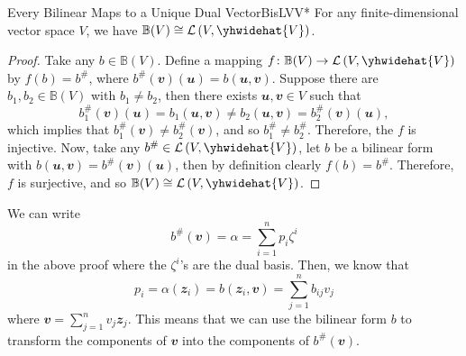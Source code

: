 \documentclass[math, code]{amznotes}
\theoremstyle{remark}
\begin{document}
\begin{probox}{Every Bilinear Maps to a Unique Dual Vector}{BisLVV*}
    For any finite-dimensional vector space $V$, we have $\mathbb{B}(V) \cong \mathcal{L}\left(V, \yhwidehat{V}\right)$.
    \tcblower
    \begin{proof}
        Take any $b \in \mathbb{B}(V)$. Define a mapping $f \colon \mathbb{B}(V) \to  \mathcal{L}\left(V, \yhwidehat{V}\right)$ by $f(b) = b^{\#}$, where $b^{\#}(\mathbfit{v})(\mathbfit{u}) = b(\mathbfit{u}, \mathbfit{v})$. Suppose there are $b_1, b_2 \in \mathbb{B}(V)$ with $b_1 \neq b_2$, then there exists $\mathbfit{u}, \mathbfit{v} \in V$ such that 
        \begin{equation*}
            b_1^{\#}(\mathbfit{v})(\mathbfit{u}) = b_1(\mathbfit{u}, \mathbfit{v}) \neq b_2(\mathbfit{u}, \mathbfit{v}) = b_2^{\#}(\mathbfit{v})(\mathbfit{u}),
        \end{equation*}
        which implies that $b_1^{\#}(\mathbfit{v}) \neq b_2^{\#}(\mathbfit{v})$, and so $b_1^{\#} \neq b_2^{\#}$. Therefore, the $f$ is injective. Now, take any $b^{\#} \in \mathcal{L}\left(V, \yhwidehat{V}\right)$, let $b$ be a bilinear form with $b(\mathbfit{u}, \mathbfit{v}) = b^{\#}(\mathbfit{v})(\mathbfit{u})$, then by definition clearly $f(b) = b^{\#}$. Therefore, $f$ is surjective, and so $\mathbb{B}(V) \cong \mathcal{L}\left(V, \yhwidehat{V}\right)$.
    \end{proof}
\end{probox}
We can write 
\begin{equation*}
    b^{\#}(\mathbfit{v}) = \alpha = \sum_{i = 1}^{n}p_i\zeta^i
\end{equation*}
in the above proof where the $\zeta^i$'s are the dual basis. Then, we know that 
\begin{equation*}
    p_i = \alpha\left(\mathbfit{z}_i\right) = b\left(\mathbfit{z}_i, \mathbfit{v}\right) = \sum_{j = 1}^{n}b_{ij}v_j
\end{equation*}
where $\mathbfit{v} = \sum_{j = 1}^{n}v_j\mathbfit{z}_j$. This means that we can use the bilinear form $b$ to transform the components of $\mathbfit{v}$ into the components of $b^{\#}(\mathbfit{v})$.
\end{document}
